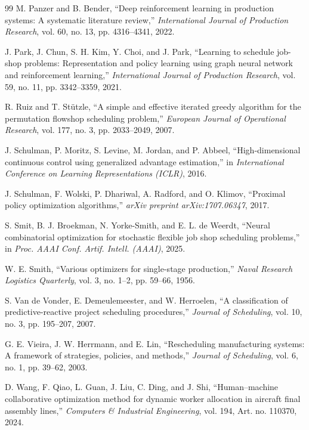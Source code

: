 \documentclass[journal,10pt]{IEEEtran}
\begin{document}
\begin{thebibliography}{99}
 M. Panzer and B. Bender, ``Deep reinforcement learning in production systems: A systematic literature review,'' \emph{International Journal of Production Research}, vol. 60, no. 13, pp. 4316--4341, 2022.

 J. Park, J. Chun, S. H. Kim, Y. Choi, and J. Park, ``Learning to schedule job-shop problems: Representation and policy learning using graph neural network and reinforcement learning,'' \emph{International Journal of Production Research}, vol. 59, no. 11, pp. 3342--3359, 2021.

 R. Ruiz and T. Stützle, ``A simple and effective iterated greedy algorithm for the permutation flowshop scheduling problem,'' \emph{European Journal of Operational Research}, vol. 177, no. 3, pp. 2033--2049, 2007.

 J. Schulman, P. Moritz, S. Levine, M. Jordan, and P. Abbeel, ``High-dimensional continuous control using generalized advantage estimation,'' in \emph{International Conference on Learning Representations (ICLR)}, 2016.

 J. Schulman, F. Wolski, P. Dhariwal, A. Radford, and O. Klimov, ``Proximal policy optimization algorithms,'' \emph{arXiv preprint arXiv:1707.06347}, 2017.

 S. Smit, B. J. Broekman, N. Yorke-Smith, and E. L. de Weerdt, ``Neural combinatorial optimization for stochastic flexible job shop scheduling problems,'' in \emph{Proc. AAAI Conf. Artif. Intell. (AAAI)}, 2025.

 W. E. Smith, ``Various optimizers for single-stage production,'' \emph{Naval Research Logistics Quarterly}, vol. 3, no. 1--2, pp. 59--66, 1956.

 S. Van de Vonder, E. Demeulemeester, and W. Herroelen, ``A classification of predictive-reactive project scheduling procedures,'' \emph{Journal of Scheduling}, vol. 10, no. 3, pp. 195--207, 2007.

 G. E. Vieira, J. W. Herrmann, and E. Lin, ``Rescheduling manufacturing systems: A framework of strategies, policies, and methods,'' \emph{Journal of Scheduling}, vol. 6, no. 1, pp. 39--62, 2003.

 D. Wang, F. Qiao, L. Guan, J. Liu, C. Ding, and J. Shi, ``Human--machine collaborative optimization method for dynamic worker allocation in aircraft final assembly lines,'' \emph{Computers \& Industrial Engineering}, vol. 194, Art. no. 110370, 2024.


\end{thebibliography}
\end{document}
